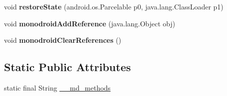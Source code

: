 \begin{DoxyCompactItemize}
void {\bfseries restore\+State} (android.\+os.\+Parcelable p0, java.\+lang.\+Class\+Loader p1)
\item 
\mbox{\label{classmd5270abb39e60627f0f200893b490a1ade_1_1FormsFragmentPagerAdapter__1_a87599b19cc33d84cefbf80e0b04fcfab}} 
void {\bfseries monodroid\+Add\+Reference} (java.\+lang.\+Object obj)
\item 
\mbox{\label{classmd5270abb39e60627f0f200893b490a1ade_1_1FormsFragmentPagerAdapter__1_a5941647e9fc5cbd3d54d30eb23d50364}} 
void {\bfseries monodroid\+Clear\+References} ()
\end{DoxyCompactItemize}
\subsection*{Static Public Attributes}
\begin{DoxyCompactItemize}
\item 
static final String \hyperlink{classmd5270abb39e60627f0f200893b490a1ade_1_1FormsFragmentPagerAdapter__1_a8ceb71ce95bf7e4591c10f858ad3dd52}{\+\_\+\+\_\+md\+\_\+methods}
\end{DoxyCompactItemize}
